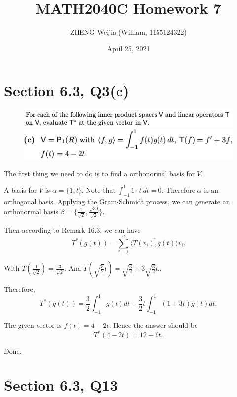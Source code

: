 \documentclass[12pt]{article}%
\begin{document}
\title{MATH2040C Homework 7}
\author{ZHENG Weijia (William, 1155124322)}
\date{April 25, 2021}
\maketitle

\large

\section{Section 6.3, Q3(c)}

\begin{figure}[htp]
    \centering %
    \includegraphics[width = 16cm]{img/Q1a.png}
    \includegraphics*[width = 15cm]{img/Q1b.png}
\end{figure}


The first thing we need to do is to find a orthonormal basis for $V$.

A basis for $V$ is $\alpha=\{1,t\}.$ Note that $\int_{-1}^{1}1\cdot t ~dt =0.$
Therefore $\alpha$ is an orthogonal basis. Applying the Gram-Schmidt process, we can 
generate an orthonormal basis $\beta=\{\frac{1}{\sqrt{2}},\frac{\sqrt{3}t}{\sqrt{2}} \}$.

Then according to Remark 16.3, we can have 
$$T^* (g(t))=\sum_{i=1}^n \overline{\langle T(v_i),g(t) \rangle} v_i.$$

With $T(\frac{1}{\sqrt{2}})=\frac{3}{\sqrt{2}}$. 
And $T(\sqrt{\frac{3}{2}}t)=\sqrt{\frac{3}{2}}+3\sqrt{\frac{3}{2}}t.$. 

Therefore, $$T^*(g(t))=\frac{3}{2}\int_{-1}^1 g(t)dt + \frac{3}{2}t\int_{-1}^1 (1+3t)g(t)dt.$$

The given vector is $f(t)=4-2t.$ Hence the answer should be 
$$T^*(4-2t)=12+6t.$$

Done.



\newpage

\section{Section 6.3, Q13}
\end{document}
